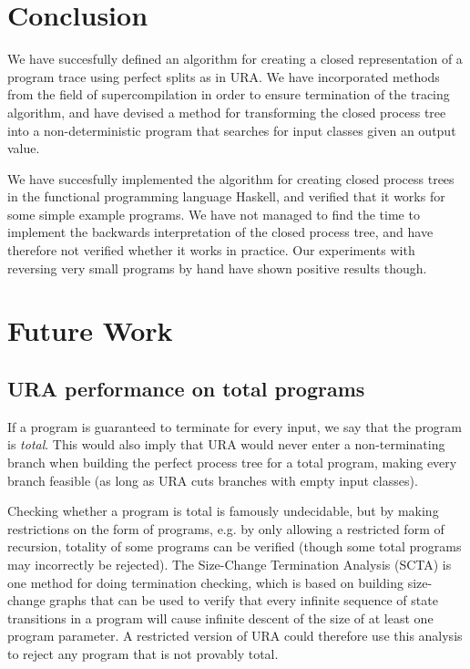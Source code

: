 \documentclass[10pt]{../sigplanconf}
\begin{document}
\section{Conclusion}
We have succesfully defined an algorithm for creating a closed
representation of a program trace using perfect splits as in URA. We
have incorporated methods from the field of supercompilation in order
to ensure termination of the tracing algorithm, and have devised a
method for transforming the closed process tree into a
non-deterministic program that searches for input classes given an
output value.

We have succesfully implemented the algorithm for creating closed
process trees in the functional programming language Haskell, and
verified that it works for some simple example programs. We have not
managed to find the time to implement the backwards interpretation of
the closed process tree, and have therefore not verified whether it
works in practice. Our experiments with reversing very small programs
by hand have shown positive results though.

\section{Future Work}
\subsection{URA performance on total programs}
If a program is guaranteed to terminate for every input, we say that
the program is \emph{total}. This would also imply that URA would
never enter a non-terminating branch when building the perfect process
tree for a total program, making every branch feasible (as long as URA
cuts branches with empty input classes).

Checking whether a program is total is famously undecidable, but by
making restrictions on the form of programs, e.g. by only allowing a
restricted form of recursion, totality of some programs can be
verified (though some total programs may incorrectly be rejected). The
Size-Change Termination Analysis (SCTA)\cite{lee2001size} is one
method for doing termination checking, which is based on building
size-change graphs that can be used to verify that every infinite
sequence of state transitions in a program will cause infinite descent
of the size of at least one program parameter. A restricted version of
URA could therefore use this analysis to reject any program that is
not provably total.
\end{document}
